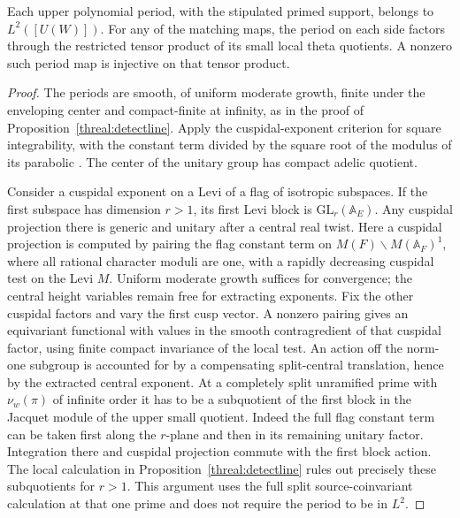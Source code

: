 \begin{lemma}\label{tcr:kernels}
Each upper polynomial period, with the stipulated primed support,
belongs to \(L^2([U(W)])\). For any of the matching maps, the period
on each side factors through the restricted tensor product of its
small local theta quotients. A nonzero such period map is injective
on that tensor product.
\end{lemma}
\begin{proof}
The periods are smooth, of uniform moderate growth, finite under the
enveloping center and compact-finite at infinity, as in the proof
of Proposition~\ref{threal:detectline}. Apply the cuspidal-exponent
criterion for square integrability, with the constant term divided
by the square root of the modulus of its parabolic
\cite[I.4.11]{moeglinWaldspurger}. The center of the unitary group
has compact adelic quotient.

Consider a cuspidal exponent on a Levi of a flag of isotropic
subspaces. If the first subspace has dimension \(r>1\), its first
Levi block is \(\mathrm{GL}_r(\mathbb A_E)\). Any cuspidal projection
there is generic and unitary after a central real twist. Here a
cuspidal projection is computed by pairing the flag constant term
on \(M(F)\backslash M(\mathbb A_F)^1\), where all rational
character moduli are one, with a rapidly decreasing cuspidal test
on the Levi \(M\). Uniform moderate growth suffices for convergence;
the central height variables remain free for extracting exponents.
Fix the other cuspidal factors and vary the first cusp vector. A
nonzero pairing gives an equivariant functional with values in
the smooth contragredient of that cuspidal factor, using finite
compact invariance of the local test. An action off the norm-one
subgroup is accounted for by a compensating split-central
translation, hence by the extracted central exponent.
At a completely
split unramified prime with \(\nu_w(\pi)\) of infinite order it has
to be a subquotient of the first block in the Jacquet module of the
upper small quotient. Indeed the full flag constant term can be taken
first along the \(r\)-plane and then in its remaining unitary factor.
Integration there and cuspidal projection commute with the first
block action. The local calculation in Proposition~\ref{threal:detectline}
rules out precisely these subquotients for \(r>1\). This argument
uses the full split source-coinvariant calculation at that one
prime and does not require the period to be in \(L^2\).


\end{proof}

